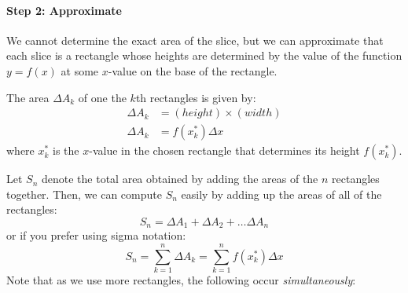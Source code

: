 \documentclass{ximera}
\begin{document}
\paragraph{Step 2: Approximate}

We cannot determine the exact area of the slice, but we can approximate that each slice is a rectangle whose heights are determined by the value of the function $y = f(x)$ at some $x$-value on the base of the rectangle. 


The area $\Delta A_k$ of one the $k$th rectangles is given by: 
\begin{align}
\Delta A_k & = (height) \times (width) \nonumber \\
\Delta A_k &= f\left(x_k^*\right)\Delta x 
\end{align}
where $x_k^*$ is the $x$-value in the chosen rectangle that determines its height $f(x_k^*)$. 

Let $S_n$ denote the total area obtained by adding the areas of the $n$ rectangles together.   Then, we can compute $S_n$ easily by adding up the areas of all of the rectangles: $$S_n = \Delta A_1 + \Delta A_2 + \ldots \Delta A_n$$
or if you prefer using sigma notation: 
\begin{equation}
S_n =\sum_{k=1}^{n} \Delta A_k =  \sum_{k=1}^n f(x_k^*) \Delta x 
\end{equation}
Note that as we use more rectangles, the following occur \emph{simultaneously}:
\end{document}
